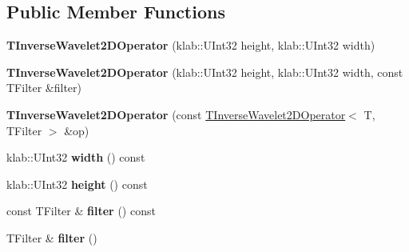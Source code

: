 \subsection*{Public Member Functions}
\begin{DoxyCompactItemize}
\item 
{\bfseries T\+Inverse\+Wavelet2\+D\+Operator} (klab\+::\+U\+Int32 height, klab\+::\+U\+Int32 width)\hypertarget{classkl1p_1_1TInverseWavelet2DOperator_a3008c752a29449719a7f5be466fb1d00}{}\label{classkl1p_1_1TInverseWavelet2DOperator_a3008c752a29449719a7f5be466fb1d00}

\item 
{\bfseries T\+Inverse\+Wavelet2\+D\+Operator} (klab\+::\+U\+Int32 height, klab\+::\+U\+Int32 width, const T\+Filter \&filter)\hypertarget{classkl1p_1_1TInverseWavelet2DOperator_ad22581126d21a25981db622d6eb1ecc3}{}\label{classkl1p_1_1TInverseWavelet2DOperator_ad22581126d21a25981db622d6eb1ecc3}

\item 
{\bfseries T\+Inverse\+Wavelet2\+D\+Operator} (const \hyperlink{classkl1p_1_1TInverseWavelet2DOperator}{T\+Inverse\+Wavelet2\+D\+Operator}$<$ T, T\+Filter $>$ \&op)\hypertarget{classkl1p_1_1TInverseWavelet2DOperator_a1d5b38500b06fc587e953caa426e9731}{}\label{classkl1p_1_1TInverseWavelet2DOperator_a1d5b38500b06fc587e953caa426e9731}

\item 
klab\+::\+U\+Int32 {\bfseries width} () const \hypertarget{classkl1p_1_1TInverseWavelet2DOperator_a9bdc422795b96057fead4922c4b69e12}{}\label{classkl1p_1_1TInverseWavelet2DOperator_a9bdc422795b96057fead4922c4b69e12}

\item 
klab\+::\+U\+Int32 {\bfseries height} () const \hypertarget{classkl1p_1_1TInverseWavelet2DOperator_a4c5f771aa749977aeabdbc8e45716ec4}{}\label{classkl1p_1_1TInverseWavelet2DOperator_a4c5f771aa749977aeabdbc8e45716ec4}

\item 
const T\+Filter \& {\bfseries filter} () const \hypertarget{classkl1p_1_1TInverseWavelet2DOperator_a81fe9a3a15150dc3d619d505d02e85bd}{}\label{classkl1p_1_1TInverseWavelet2DOperator_a81fe9a3a15150dc3d619d505d02e85bd}

\item 
T\+Filter \& {\bfseries filter} ()\hypertarget{classkl1p_1_1TInverseWavelet2DOperator_a69dd06dbf423e0db49a31a4e190a2b67}{}\label{classkl1p_1_1TInverseWavelet2DOperator_a69dd06dbf423e0db49a31a4e190a2b67}


\end{DoxyCompactItemize}

